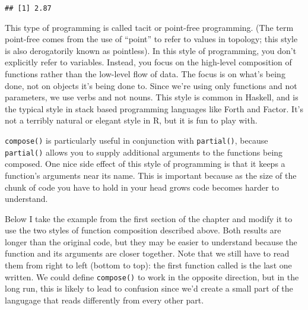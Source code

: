 \begin{verbatim}
## [1] 2.87
\end{verbatim}

This type of programming is called tacit or point-free programming. (The
term point-free comes from the use of ``point'' to refer to values in
topology; this style is also derogatorily known as pointless). In this
style of programming, you don't explicitly refer to variables. Instead,
you focus on the high-level composition of functions rather than the
low-level flow of data. The focus is on what's being done, not on
objects it's being done to. Since we're using only functions and not
parameters, we use verbs and not nouns. This style is common in Haskell,
and is the typical style in stack based programming languages like Forth
and Factor. It's not a terribly natural or elegant style in R, but it is
fun to play with. 

\texttt{compose()} is particularly useful in conjunction with
\texttt{partial()}, because \texttt{partial()} allows you to supply
additional arguments to the functions being composed. One nice side
effect of this style of programming is that it keeps a function's
arguments near its name. This is important because as the size of the
chunk of code you have to hold in your head grows code becomes harder to
understand.

Below I take the example from the first section of the chapter and
modify it to use the two styles of function composition described above.
Both results are longer than the original code, but they may be easier
to understand because the function and its arguments are closer
together. Note that we still have to read them from right to left
(bottom to top): the first function called is the last one written. We
could define \texttt{compose()} to work in the opposite direction, but
in the long run, this is likely to lead to confusion since we'd create a
small part of the langugage that reads differently from every other
part.

\begin{Shaded}
\end{Shaded}

